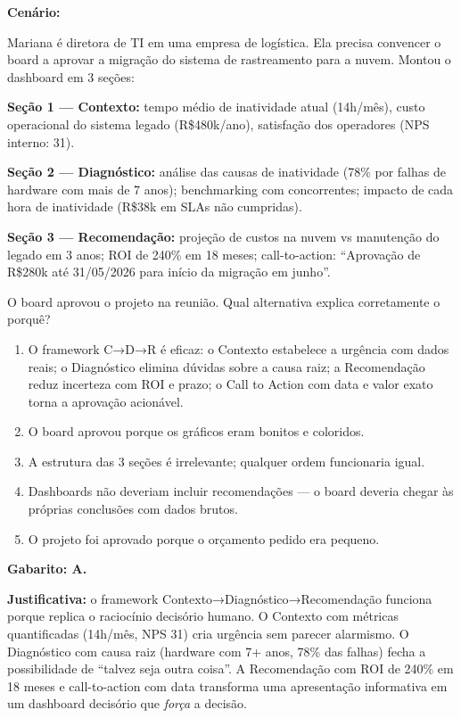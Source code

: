 \begin{SolvedBox}
\textbf{Cenário:}

Mariana é diretora de TI em uma empresa de logística. Ela precisa convencer o board
a aprovar a migração do sistema de rastreamento para a nuvem. Montou o dashboard em
3 seções:

\textbf{Seção 1 — Contexto:} tempo médio de inatividade atual (14h/mês), custo
operacional do sistema legado (R\$480k/ano), satisfação dos operadores (NPS interno: 31).

\textbf{Seção 2 — Diagnóstico:} análise das causas de inatividade (78\% por falhas
de hardware com mais de 7 anos); benchmarking com concorrentes; impacto de cada hora
de inatividade (R\$38k em SLAs não cumpridas).

\textbf{Seção 3 — Recomendação:} projeção de custos na nuvem vs manutenção do legado
em 3 anos; ROI de 240\% em 18 meses; call-to-action: ``Aprovação de R\$280k até
31/05/2026 para início da migração em junho''.

O board aprovou o projeto na reunião. Qual alternativa explica corretamente o porquê?

\begin{enumerate}[label=\Alph*)]
  \item O framework C→D→R é eficaz: o Contexto estabelece a urgência com dados reais;
  o Diagnóstico elimina dúvidas sobre a causa raiz; a Recomendação reduz incerteza
  com ROI e prazo; o Call to Action com data e valor exato torna a aprovação acionável.
  \item O board aprovou porque os gráficos eram bonitos e coloridos.
  \item A estrutura das 3 seções é irrelevante; qualquer ordem funcionaria igual.
  \item Dashboards não deveriam incluir recomendações — o board deveria chegar às
  próprias conclusões com dados brutos.
  \item O projeto foi aprovado porque o orçamento pedido era pequeno.
\end{enumerate}

\medskip
\textbf{Gabarito: A.}

\textbf{Justificativa:} o framework Contexto→Diagnóstico→Recomendação funciona porque
replica o raciocínio decisório humano. O Contexto com métricas quantificadas (14h/mês,
NPS 31) cria urgência sem parecer alarmismo. O Diagnóstico com causa raiz (hardware
com 7+ anos, 78\% das falhas) fecha a possibilidade de ``talvez seja outra coisa''.
A Recomendação com ROI de 240\% em 18 meses e call-to-action com data transforma uma
apresentação informativa em um dashboard decisório que \emph{força} a decisão.
\end{SolvedBox}

